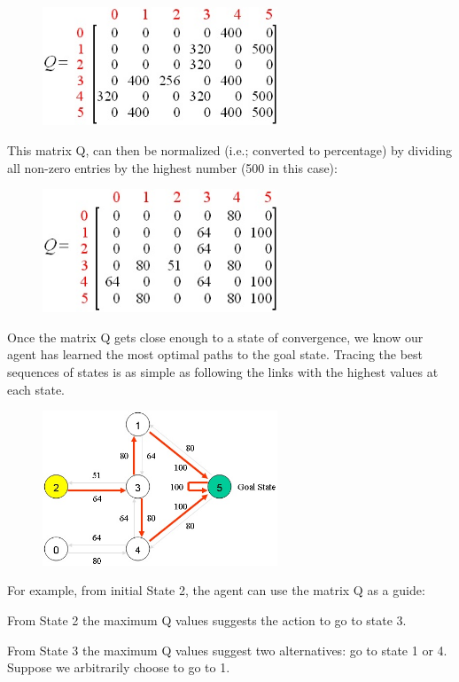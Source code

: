 \documentclass[a4paper, 11pt]{article}
\begin{document}
\begin{figure}[ht]
\centering
\includegraphics[width=7cm]{Pic/q_matrix4}
\end{figure}

This matrix Q, can then be normalized (i.e.; converted to percentage) by dividing all non-zero entries by the highest number (500 in this case):

\begin{figure}[ht]
\centering
\includegraphics[width=7cm]{Pic/q_matrix5}
\end{figure}

Once the matrix Q gets close enough to a state of convergence, we know our agent has learned the most optimal paths to the goal state.  Tracing the best sequences of states is as simple as following the links with the highest values at each state.

\begin{figure}[ht]
\centering
\includegraphics[width=7cm]{Pic/map5}
\end{figure}

For example, from initial State 2, the agent can use the matrix Q as a guide:

From State 2 the maximum Q values suggests the action to go to state 3.

From State 3 the maximum Q values suggest two alternatives: go to state 1 or 4.  Suppose we arbitrarily choose  to go to 1.
\end{document}
